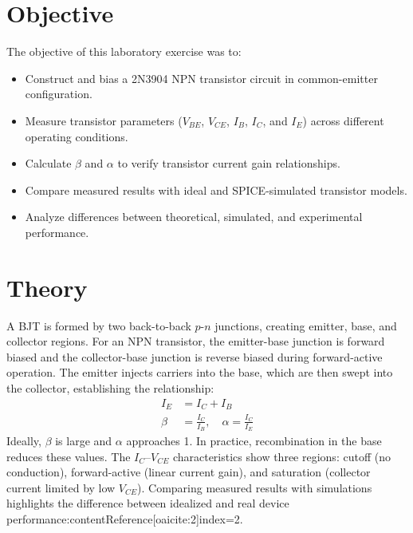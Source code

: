 \documentclass[12pt]{article}
\begin{document}
\section{Objective}
The objective of this laboratory exercise was to:
\begin{itemize}
  \item Construct and bias a 2N3904 NPN transistor circuit in common-emitter configuration.
  \item Measure transistor parameters ($V_{BE}$, $V_{CE}$, $I_B$, $I_C$, and $I_E$) across different operating conditions.
  \item Calculate $\beta$ and $\alpha$ to verify transistor current gain relationships.
  \item Compare measured results with ideal and SPICE-simulated transistor models.
  \item Analyze differences between theoretical, simulated, and experimental performance.
\end{itemize}

\section{Theory}
A BJT is formed by two back-to-back $p$-$n$ junctions, creating emitter, base, and collector regions. For an NPN transistor, the emitter-base junction is forward biased and the collector-base junction is reverse biased during forward-active operation. The emitter injects carriers into the base, which are then swept into the collector, establishing the relationship:
\begin{align*}
I_E &= I_C + I_B \\
\beta &= \frac{I_C}{I_B}, \quad \alpha = \frac{I_C}{I_E}
\end{align*}
Ideally, $\beta$ is large and $\alpha$ approaches 1. In practice, recombination in the base reduces these values. The $I_C$--$V_{CE}$ characteristics show three regions: cutoff (no conduction), forward-active (linear current gain), and saturation (collector current limited by low $V_{CE}$). Comparing measured results with simulations highlights the difference between idealized and real device performance:contentReference[oaicite:2]{index=2}.
\end{document}
